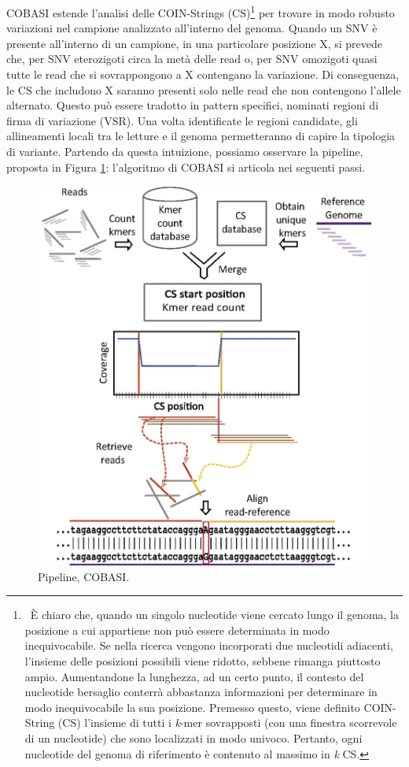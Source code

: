 \documentclass[../main.tex]{subfiles}
\begin{document}
COBASI estende l'analisi delle COIN-Strings (CS)\footnote{\ È chiaro che, quando un singolo nucleotide viene cercato lungo il genoma, la posizione a cui appartiene non può essere determinata in modo inequivocabile. Se nella ricerca vengono incorporati due nucleotidi adiacenti, l'insieme delle posizioni possibili viene ridotto, sebbene rimanga piuttosto ampio. Aumentandone la lunghezza, ad un certo punto, il contesto del nucleotide bersaglio conterrà abbastanza informazioni per determinare in modo inequivocabile la sua posizione. Premesso questo, viene definito COIN-String (CS) l'insieme di tutti i \textit{k}-mer sovrapposti (con una finestra scorrevole di un nucleotide) che sono localizzati in modo univoco. Pertanto, ogni nucleotide del genoma di riferimento è contenuto al massimo in \textit{k} CS.} per trovare in modo robusto variazioni nel campione analizzato all'interno del genoma. Quando un SNV è presente all'interno di un campione, in una particolare posizione X, si prevede che, per SNV eterozigoti circa la metà delle read o, per SNV omozigoti quasi tutte le read che si sovrappongono a X contengano la variazione. Di conseguenza, le CS che includono X saranno presenti solo nelle read che non contengono l'allele alternato. Questo può essere tradotto in pattern specifici, nominati regioni di firma di variazione (VSR). Una volta identificate le regioni candidate, gli allineamenti locali tra le letture e il genoma permetteranno di capire la tipologia di variante. Partendo da questa intuizione, possiamo osservare la pipeline, proposta in Figura \ref{fig:cobasi}: l'algoritmo di COBASI si articola nei seguenti passi.

 \begin{figure}[h!]
	\centering
  	\captionsetup{justification=centering}
 	\includegraphics[scale=.15]{images/cobasi_pipeline.png}
  	\caption{Pipeline, COBASI.}
  	\label{fig:cobasi}
\end{figure}
\end{document}
